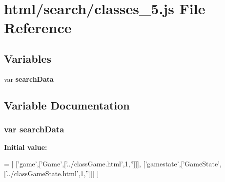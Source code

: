 \section{html/search/classes\-\_\-5.js File Reference}
\label{classes__5_8js}
\subsection*{Variables}
\begin{DoxyCompactItemize}
\item 
var {\bf search\-Data}
\end{DoxyCompactItemize}


\subsection{Variable Documentation}
\subsubsection[{search\-Data}]{\setlength{\rightskip}{0pt plus 5cm}var search\-Data}\label{classes__5_8js_ad01a7523f103d6242ef9b0451861231e}
{\bfseries Initial value\-:}
\begin{DoxyCode}
=
[
  [\textcolor{stringliteral}{'game'},[\textcolor{stringliteral}{'Game'},[\textcolor{stringliteral}{'../classGame.html'},1,\textcolor{stringliteral}{''}]]],
  [\textcolor{stringliteral}{'gamestate'},[\textcolor{stringliteral}{'GameState'},[\textcolor{stringliteral}{'../classGameState.html'},1,\textcolor{stringliteral}{''}]]]
]
\end{DoxyCode}
